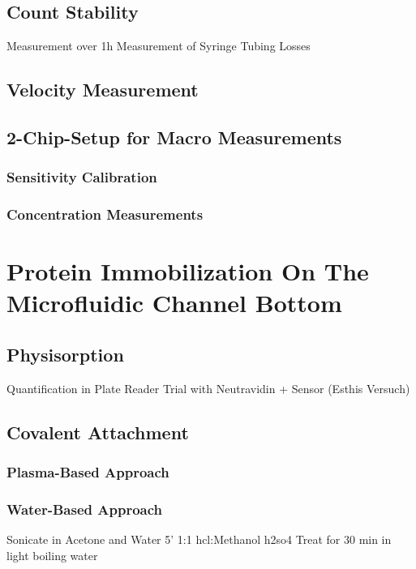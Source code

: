 \subsection{Count Stability}
Measurement over 1h
Measurement of Syringe Tubing Losses

\subsection{Velocity Measurement}

\subsection{2-Chip-Setup for Macro Measurements}

\subsubsection{Sensitivity Calibration}

\subsubsection{Concentration Measurements}

\section{Protein Immobilization On The Microfluidic Channel Bottom}

\subsection{Physisorption}
Quantification in Plate Reader
Trial with Neutravidin + Sensor (Esthis Versuch)

\subsection{Covalent Attachment}

\subsubsection{Plasma-Based Approach}

\subsubsection{Water-Based Approach}
Sonicate in Acetone and Water 5'
1:1 \gls{hcl}:Methanol
\gls{h2so4}
Treat for 30 min in light boiling water